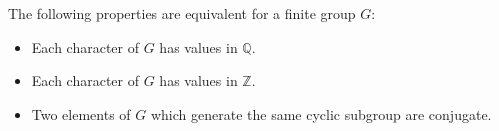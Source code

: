 The following properties are equivalent for a finite group $G$:

\begin{itemize}
\item[(i)] Each character of $G$ has values in $\mathbb{Q}$.
\item[(i')] Each character of $G$ has values in $\mathbb{Z}$.
\item[(ii)] Two elements of $G$ which generate the same cyclic subgroup are conjugate.
\end{itemize}
